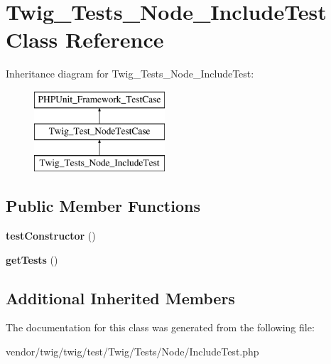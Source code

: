 \hypertarget{classTwig__Tests__Node__IncludeTest}{}\section{Twig\+\_\+\+Tests\+\_\+\+Node\+\_\+\+Include\+Test Class Reference}
\label{classTwig__Tests__Node__IncludeTest}
Inheritance diagram for Twig\+\_\+\+Tests\+\_\+\+Node\+\_\+\+Include\+Test\+:\begin{figure}[H]
\begin{center}
\leavevmode
\includegraphics[height=3.000000cm]{classTwig__Tests__Node__IncludeTest}
\end{center}
\end{figure}
\subsection*{Public Member Functions}
\begin{DoxyCompactItemize}
\item 
{\bfseries test\+Constructor} ()\hypertarget{classTwig__Tests__Node__IncludeTest_a06e59216e69c921e8cb4025a01d45d07}{}\label{classTwig__Tests__Node__IncludeTest_a06e59216e69c921e8cb4025a01d45d07}

\item 
{\bfseries get\+Tests} ()\hypertarget{classTwig__Tests__Node__IncludeTest_a6143d1df914418c36e2f014b34efa20a}{}\label{classTwig__Tests__Node__IncludeTest_a6143d1df914418c36e2f014b34efa20a}

\end{DoxyCompactItemize}
\subsection*{Additional Inherited Members}


The documentation for this class was generated from the following file\+:\begin{DoxyCompactItemize}
\item 
vendor/twig/twig/test/\+Twig/\+Tests/\+Node/Include\+Test.\+php\end{DoxyCompactItemize}
